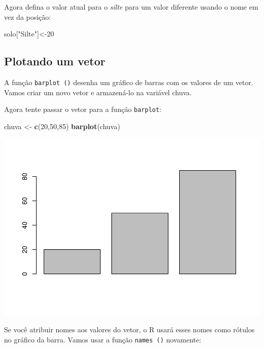 \documentclass[
]{book}
\newenvironment{Shaded}{\begin{snugshade}}{\end{snugshade}}
\newcommand{\DecValTok}[1]{\textcolor[rgb]{0.00,0.00,0.81}{#1}}
\newcommand{\KeywordTok}[1]{\textcolor[rgb]{0.13,0.29,0.53}{\textbf{#1}}}
\newcommand{\NormalTok}[1]{#1}
\newcommand{\StringTok}[1]{\textcolor[rgb]{0.31,0.60,0.02}{#1}}
\begin{document}
Agora defina o valor atual para o \emph{silte} para um valor diferente usando o nome em vez da posição:

\begin{Shaded}
\begin{Highlighting}[]
\NormalTok{solo[}\StringTok{"Silte"}\NormalTok{]<-}\DecValTok{20}
\end{Highlighting}
\end{Shaded}

\hypertarget{plotando-um-vetor}{%
\subsection{Plotando um vetor}\label{plotando-um-vetor}}

A função \texttt{barplot\ ()} desenha um gráfico de barras com os valores de um vetor. Vamos criar um novo vetor e armazená-lo na variável chuva.

Agora tente passar o vetor para a função \texttt{barplot}:

\begin{Shaded}
\begin{Highlighting}[]
\NormalTok{chuva <-}\StringTok{ }\KeywordTok{c}\NormalTok{(}\DecValTok{20}\NormalTok{,}\DecValTok{50}\NormalTok{,}\DecValTok{85}\NormalTok{)}
\KeywordTok{barplot}\NormalTok{(chuva)}
\end{Highlighting}
\end{Shaded}

\includegraphics{TudodoR_files/figure-latex/unnamed-chunk-32-1.pdf}

Se você atribuir nomes aos valores do vetor, o R usará esses nomes como rótulos no gráfico da barra. Vamos usar a função \texttt{names\ ()} novamente:
\end{document}
